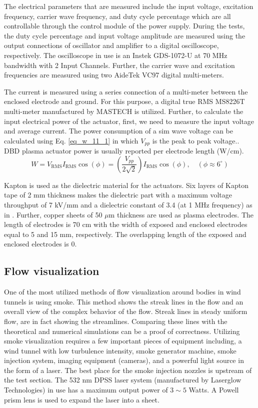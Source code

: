 \documentclass[fleqn,10pt]{SelfArx} %
\begin{document}
The electrical parameters that are measured include the input voltage, excitation frequency, carrier wave frequency, and duty cycle percentage which are all controllable through the control module of the power supply. During the tests, the duty cycle percentage and input voltage amplitude are measured using the output connections of oscillator and amplifier to a digital oscilloscope, respectively. The oscilloscope in use is an Instek GDS-1072-U at 70 MHz bandwidth with 2 Input Channels. Further, the carrier wave and excitation frequencies are measured using two AideTek VC97 digital multi-meters.

The current is measured using a series connection of a multi-meter between the enclosed electrode and ground. For this purpose, a digital true RMS MS8226T multi-meter manufactured by MASTECH is utilized. Further, to calculate the input electrical power of the actuator, first, we need to measure the input voltage and average current. The power consumption of a sim wave voltage can be calculated using Eq. \ref{eq_w_11_1} in which $V_{pp}$ is the peak to peak voltage.. DBD plasma actuator power is usually reported per electrode length (W/cm).
\begin{equation}
\label{eq_w_11_1}
W=V_{\text{RMS}} I_{\text{RMS}}\cos(\phi)=\left(\dfrac{V_{pp}}{2\sqrt{2}}\right)I_{\text{RMS}}\cos(\phi), \quad (\phi\approx6^{\circ})
\end{equation}

Kapton is used as the dielectric material for the actuators. Six layers of Kapton tape of 2 mm thickness makes the dielectric part with a maximum voltage throughput of 7 kV/mm and a dielectric constant of 3.4 (at 1 MHz frequency) as in \cite{Feng2012}. Further, copper sheets of 50 $\mu$m thickness are used as plasma electrodes. The length of electrodes is 70 cm with the width of exposed and enclosed electrodes equal to 5 and 15 mm, respectively. The overlapping length of the exposed and enclosed electrodes is 0.

\subsection{Flow visualization}
One of the most utilized methods of flow visualization around bodies in wind tunnels is using smoke. This method shows the streak lines in the flow and an overall view of the complex behavior of the flow. Streak lines in steady uniform flow, are in fact showing the streamlines. Comparing these lines with the theoretical and numerical simulations can be a proof of correctness. Utilizing smoke visualization requires a few important pieces of equipment including, a wind tunnel with low turbulence intensity, smoke generator machine, smoke injection system, imaging equipment (cameras), and a powerful light source in the form of a laser. The best place for the smoke injection nozzles is upstream of the test section. The 532 nm DPSS laser system (manufactured by Laserglow Technologies) in use has a maximum output power of $3\sim 5$ Watts. A Powell prism lens is used to expand the laser into a sheet.
\end{document}
